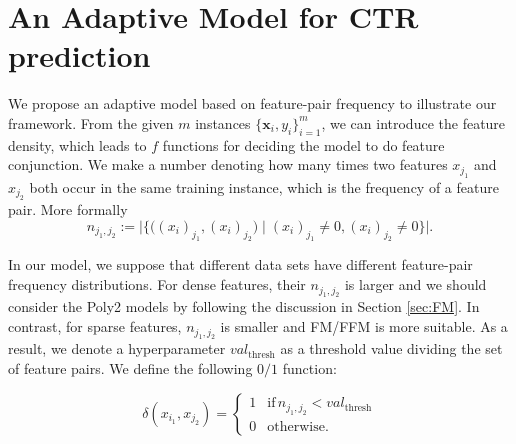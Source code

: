 \section{An Adaptive Model for CTR prediction}

\label{sec:model}

We propose an adaptive model based on feature-pair frequency to illustrate our framework. From the given $m$ instances $\lbrace\boldsymbol{x}_i,y_i\rbrace_{i=1}^m$, we can introduce the %
feature density, which leads to $f$ functions for deciding the model to do feature conjunction. We make a number denoting how many times two features $x_{j_1}$ and $x_{j_2}$ both occur in the same training instance, which is the frequency of a feature pair. More formally
\begin{equation}
n_{j_1,j_2} := \lvert\lbrace\bigl((x_i)_{j_1},(x_i)_{j_2}\bigr) \mid (x_i)_{j_1}\ne0, (x_i)_{j_2}\ne0\rbrace\rvert.
\end{equation}

In our model, we suppose that different data sets have different feature-pair frequency distributions. For dense features, their $n_{j_1,j_2}$ is larger and we should consider the Poly2 models by following the discussion in Section \ref{sec:FM}. In contrast, for sparse features, $n_{j_1,j_2}$ is smaller and FM/FFM is more suitable.
As a result, we denote  a hyperparameter $val_{\text{thresh}}$ as a threshold value dividing the set of feature pairs. We define the following $0/1$ function:

\begin{equation}
\label{2.0}
\delta(x_{i_1},x_{j_2})=
\begin{cases}
1& \text{if}\, n_{j_1, j_2} < val_{\text{thresh}} \\
0& \text{otherwise}.
\end{cases}
\end{equation}

